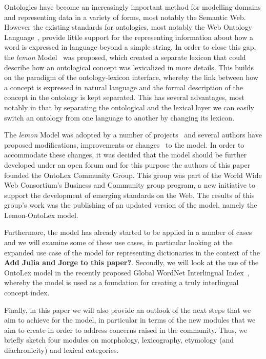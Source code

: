 \documentclass[12pt,a4paper]{elex2017}
\begin{document}
Ontologies have become an increasingly important method for modelling domains and
representing data in a variety of forms, most notably the Semantic Web. However
the existing standards for ontologies, most notably the Web Ontology
Language~\citep[OWL]{mcguinness2004ow}, provide little support for the
representing information about how a word is expressed in language beyond a
simple string. In order to close this gap, the \emph{lemon}
Model~\citep{mccrae2012interchanging} was proposed, which created a separate
lexicon that could describe how an ontological concept was lexicalized in more
details. This builds on the paradigm of the ontology-lexicon interface, whereby
the link between how a concept is expressed in natural language and the formal
description of the concept in the ontology is kept separated. This has several
advantages, most notably in that by separating the ontological and the lexical
layer we can easily switch an ontology from one language to another by changing
its lexicon. 

The \emph{lemon} Model was adopted by a number of
projects~\citep{navigli2012babelnet,serasset2015dbnary,ecklekohler2015} and
several authors have proposed modifications, improvements or
changes~\citep{khan2014using,chavula2014lemon,bosque2016linked}
to the model. In order to accommodate these changes, it was decided that the
model should be further developed under an open forum and for this purpose the
authors of this paper founded the OntoLex Community Group. This group was part
of the World Wide Web Consortium's Business and Community group program, a new
initiative to support the development of emerging standards on the Web. The
results of this group's work was the publishing of an updated version of the
model, namely the Lemon-OntoLex model.

Furthermore, the model has already started to be applied in a number of cases
and we will examine some of these use cases, in particular looking at the
expanded use case of the model for representing dictionaries in the context of
the \textbf{Add Julia and Jorge to this paper?}. Secondly, we will look at the
use of the OntoLex model in the recently proposed Global WordNet Interlingual
Index~\citep{vossen2016toward,bond2016cili}, whereby the model is used as a
foundation for creating a truly interlingual concept index.

Finally, in this paper we will also provide an outlook of the next steps that we
aim to achieve for the model, in particular in terms of the new modules that we
aim to create in order to address concerns raised in the community.
Thus, we briefly sketch four modules on morphology, lexicography,
etymology (and diachronicity) and lexical categories.
\end{document}
